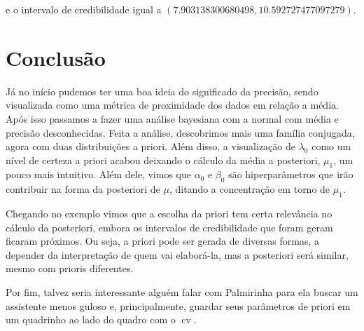 \documentclass{article}
\begin{document}
\noindent e o intervalo de credibilidade igual a $(7.903138300680498, 10.592727477097279)$.










\section*{Conclusão}

Já no início pudemos ter uma boa ideia do significado da precisão, sendo visualizada como uma métrica de proximidade dos dados em relação a média. Após isso passamos a fazer uma análise bayesiana com a normal com média e precisão desconhecidas. Feita a análise, descobrimos mais uma família conjugada, agora com duas distribuições a priori. Além disso, a visualização de $\lambda_0$ como um nível de certeza a priori acabou deixando o cálculo da média a posteriori, $\mu_1$, um pouco mais intuitivo. Além dele, vimos que $\alpha_0$ e $\beta_0$ são hiperparâmetros que irão contribuir na forma da posteriori de $\mu$, ditando a concentração em torno de $\mu_1$.

Chegando no exemplo vimos que a escolha da priori tem certa relevância no cálculo da posteriori, embora os intervalos de credibilidade que foram geram ficaram próximos. Ou seja, a priori pode ser gerada de diversas formas, a depender da interpretação de quem vai elaborá-la, mas a posteriori será similar, mesmo com prioris diferentes.

Por fim, talvez seria interessante alguém falar com Palmirinha para ela buscar um assistente menos guloso e, principalmente, guardar seus parâmetros de priori em um quadrinho ao lado do quadro com o $\operatorname{cv}$.

\printbibliography
\end{document}
